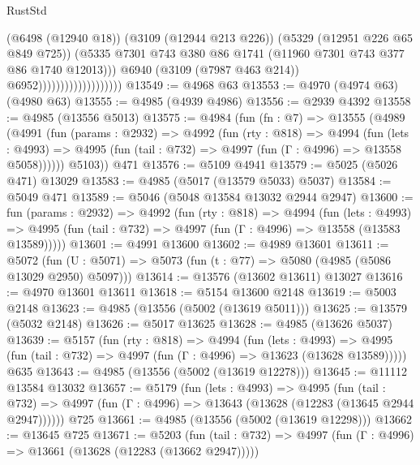 \begin{lexlean}{RustStd}
\begin{coremodule}
                                            (@6498 (@12940 @18))
                                            (@3109 (@12944 @213 @226))
                                            (@5329 (@12951 @226 @65 @849 @725))
                                            (@5335
                                              @7301
                                              @743
                                              @380
                                              @86
                                              @1741
                                              (@11960 @7301 @743 @377 @86 @1740 @12013)))
                                          @6940
                                          (@3109 (@7987 @463 @214))
                                          @6952)))))))))))))))))))
@13549 := @4968 @63
@13553 := @4970 (@4974 @63) (@4980 @63)
@13555 := @4985 (@4939 @4986)
@13556 := @2939 @4392
@13558 := @4985 (@13556 @5013)
@13575 := @4984
    (fun (fn : @7) =>
    @13555
      (@4989
        (@4991
          (fun (params : @2932) =>
          @4992
            (fun (rty : @818) =>
            @4994
              (fun (lets : @4993) =>
              @4995 (fun (tail : @732) => @4997 (fun (Γ : @4996) => @13558 @5058))))))
        @5103))
    @471
@13576 := @5109 @4941
@13579 := @5025 (@5026 @471) @13029
@13583 := @4985 (@5017 (@13579 @5033) @5037)
@13584 := @5049 @471
@13589 := @5046 (@5048 @13584 @13032 @2944 @2947)
@13600 := fun (params : @2932) =>
  @4992
    (fun (rty : @818) =>
    @4994
      (fun (lets : @4993) =>
      @4995 (fun (tail : @732) => @4997 (fun (Γ : @4996) => @13558 (@13583 @13589)))))
@13601 := @4991 @13600
@13602 := @4989 @13601
@13611 := @5072
    (fun (U : @5071) => @5073 (fun (t : @77) => @5080 (@4985 (@5086 @13029 @2950) @5097)))
@13614 := @13576 (@13602 @13611) @13027
@13616 := @4970 @13601 @13611
@13618 := @5154 @13600 @2148
@13619 := @5003 @2148
@13623 := @4985 (@13556 (@5002 (@13619 @5011)))
@13625 := @13579 (@5032 @2148)
@13626 := @5017 @13625
@13628 := @4985 (@13626 @5037)
@13639 := @5157
    (fun (rty : @818) =>
    @4994
      (fun (lets : @4993) =>
      @4995 (fun (tail : @732) => @4997 (fun (Γ : @4996) => @13623 (@13628 @13589)))))
    @635
@13643 := @4985 (@13556 (@5002 (@13619 @12278)))
@13645 := @11112 @13584 @13032
@13657 := @5179
    (fun (lets : @4993) =>
    @4995
      (fun (tail : @732) =>
      @4997 (fun (Γ : @4996) => @13643 (@13628 (@12283 (@13645 @2944 @2947))))))
    @725
@13661 := @4985 (@13556 (@5002 (@13619 @12298)))
@13662 := @13645 @725
@13671 := @5203
    (fun (tail : @732) => @4997 (fun (Γ : @4996) => @13661 (@13628 (@12283 (@13662 @2947)))))

\end{coremodule}
\end{lexlean}

